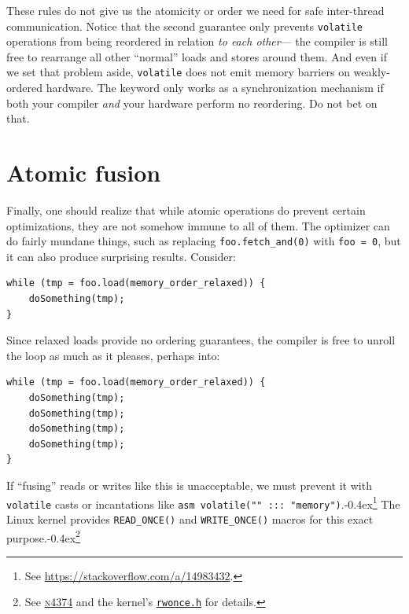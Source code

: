 \documentclass[fontsize=10pt, oneside]{scrartcl}
\newcommand{\codesize}{\fontsize{\bodyfontsize}{\bodybaselineskip}}
\newcommand{\punckern}{\kern-0.4ex}
\newcommand{\monobox}[1]{\mbox{\texttt{#1}}}
\newcommand{\keyword}[1]{\monobox{\color{darkGreen}#1}}
\newenvironment{colfigure}
  {\par\vspace{1\baselineskip minus 0.5\baselineskip}\noindent\minipage{\linewidth}}
  {\endminipage\vspace{1\baselineskip minus 0.7\baselineskip}}
\begin{document}
These rules do not give us the atomicity or order we need for safe inter-thread communication.
Notice that the second guarantee only prevents \keyword{volatile} operations from being reordered in relation \emph{to each other}---
the compiler is still free to rearrange all other ``normal'' loads and stores around them.
And even if we set that problem aside,
\keyword{volatile} does not emit memory barriers on weakly-ordered hardware.
The keyword only works as a synchronization mechanism if both your compiler \emph{and} your hardware perform no reordering.
Do not bet on that.

\section{Atomic fusion}
\label{fusing}

Finally, one should realize that while atomic operations do prevent certain optimizations,
they are not somehow immune to all of them.
The optimizer can do fairly mundane things, such as replacing
\monobox{foo.fetch\_and(0)} with \monobox{foo = 0},
but it can also produce surprising results.
Consider:
\begin{colfigure}
\begin{verbatim}
while (tmp = foo.load(memory_order_relaxed)) {
    doSomething(tmp);
}
\end{verbatim}
\end{colfigure}
Since relaxed loads provide no ordering guarantees,
the compiler is free to unroll the loop as much as it pleases,
perhaps into:
\begin{colfigure}
\begin{verbatim}
while (tmp = foo.load(memory_order_relaxed)) {
    doSomething(tmp);
    doSomething(tmp);
    doSomething(tmp);
    doSomething(tmp);
}
\end{verbatim}
\end{colfigure}
If ``fusing'' reads or writes like this is unacceptable,
we must prevent it
with \texttt{volatile} casts or incantations like \texttt{asm volatile("" ::: "memory")}.\punckern\footnote{See
\url{https://stackoverflow.com/a/14983432}.}
The Linux kernel provides \monobox{READ\_ONCE()} and \monobox{WRITE\_ONCE()}
macros for this exact purpose.\punckern\footnote{See
\href{https://www.open-std.org/jtc1/sc22/wg21/docs/papers/2015/n4374.html}{\textsc{n}4374}
and the kernel's
\href{https://elixir.bootlin.com/linux/latest/source/include/asm-generic/rwonce.h}{\texttt{rwonce.h}} for details.}
\end{document}
